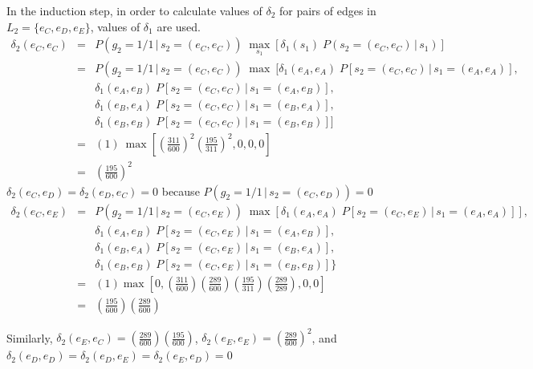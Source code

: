 \documentclass[a4paper,11pt,twoside,abstraction,titlepage]{article}
\begin{document}
\noindent In the induction step, in order to calculate values of $\delta_2$ for pairs of edges in $L_2 = \{e_{C}, e_{D}, e_{E}\}$, values of $\delta_1$ are used.
\vspace{-5pt}
\begin{eqnarray*}
\delta_2(e_C,e_C) &=& P(g_2=1/1\,|\,s_2=(e_C,e_C)) \; \max_{s_1} \left[ \delta_1(s_1) \; P(s_2=(e_C,e_C)\,|\,s_1) \right]\\
&=& P(g_2=1/1\,|\,s_2=(e_C,e_C)) \;  \max \: [ \delta_1(e_A,e_A) \; P[s_2=(e_C,e_C) \,  | \, s_1 = (e_A,e_A)],  \\
&&\delta_1(e_A,e_B) \; P[s_2=(e_C,e_C) \,  | \, s_1 = (e_A,e_B)],\\
&&\delta_1(e_B,e_A) \; P[s_2=(e_C,e_C) \,  | \, s_1 = (e_B,e_A)],\\
&&\delta_1(e_B,e_B)\; P[s_2=(e_C,e_C) \,  | \, s_1 = (e_B,e_B)] ] \\
&=& (1) \: \max\left[\left( \frac{311}{600} \right)^2 \!\! \left(\frac{195}{311}\right)^2\!,0,0,0\right] \\
&=& \left( \frac{195}{600} \right)^2
\end{eqnarray*}
\vspace{5pt}
\noindent$\delta_2(e_C,e_D) = \delta_2(e_D,e_C) = 0$ because $ P(g_2=1/1\,|\,s_2=(e_C,e_D)) = 0$
\begin{eqnarray*}
\delta_2(e_C,e_E) &=&  P(g_2=1/1\,|\,s_2=(e_C,e_E)) \;  \max \left[ \delta_1(e_A,e_A) \; P[s_2=(e_C,e_E) \,  | \, s_1 = (e_A,e_A)] \right],\\
&&\delta_1(e_A,e_B) \; P[s_2=(e_C,e_E) \,  | \, s_1 = (e_A,e_B)],\\
&&\delta_1(e_B,e_A) \; P[s_2=(e_C,e_E) \,  | \, s_1 = (e_B,e_A)],\\
&&\delta_1(e_B,e_B)\; P[s_2=(e_C,e_E) \,  | \, s_1 = (e_B,e_B)] \} \\
&=& (1) \max \left[0, \left( \frac{311}{600} \right) \!\! \left( \frac{289}{600} \right) \!\! \left(\frac{195}{311}\right) \!\! \left(\frac{289}{289}\right)\!, 0, 0\right] \\
&=& \left( \frac{195}{600} \right) \!\! \left( \frac{289}{600} \right)
\end{eqnarray*}

\noindent Similarly, $\delta_2(e_E,e_C) = \left( \frac{289}{600} \right) \!\! \left( \frac{195}{600} \right)$, $\delta_2(e_E,e_E) = \left( \frac{289}{600} \right)^2 $, and $\delta_2(e_D,e_D) = \delta_2(e_D,e_E) = \delta_2(e_E,e_D)  = 0$
\end{document}
